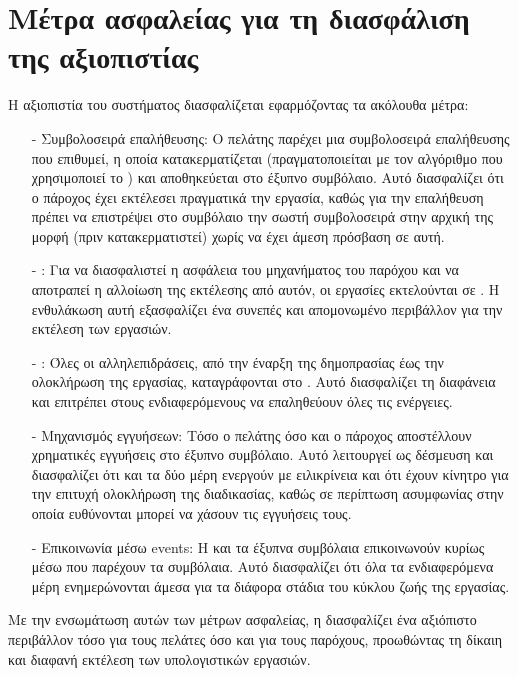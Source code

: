 \section{Μέτρα ασφαλείας για τη διασφάλιση της αξιοπιστίας}
Η αξιοπιστία του συστήματος διασφαλίζεται εφαρμόζοντας τα ακόλουθα μέτρα:
\begin{itemize}
\item[-] Συμβολοσειρά επαλήθευσης: Ο πελάτης παρέχει μια συμβολοσειρά επαλήθευσης που επιθυμεί, η οποία κατακερματίζεται (πραγματοποιείται  με τον αλγόριθμο  που χρησιμοποιεί το ) και αποθηκεύεται στο έξυπνο συμβόλαιο. Αυτό διασφαλίζει ότι ο πάροχος έχει εκτέλεσει πραγματικά την εργασία, καθώς για την επαλήθευση πρέπει να επιστρέψει στο συμβόλαιο την σωστή συμβολοσειρά στην αρχική της μορφή (πριν κατακερματιστεί) χωρίς να έχει άμεση πρόσβαση σε αυτή.
\item[-] : Για να διασφαλιστεί η ασφάλεια του μηχανήματος του παρόχου και να αποτραπεί η αλλοίωση της εκτέλεσης από αυτόν, οι εργασίες εκτελούνται σε . Η ενθυλάκωση αυτή εξασφαλίζει ένα συνεπές και απομονωμένο περιβάλλον για την εκτέλεση των εργασιών.
\item[-] : Όλες οι αλληλεπιδράσεις, από την έναρξη της δημοπρασίας έως την ολοκλήρωση της εργασίας, καταγράφονται στο . Αυτό διασφαλίζει τη διαφάνεια και επιτρέπει στους ενδιαφερόμενους να επαληθεύουν όλες τις ενέργειες. 
\item[-] Μηχανισμός εγγυήσεων:  Τόσο ο πελάτης όσο και ο πάροχος αποστέλλουν χρηματικές εγγυήσεις στο έξυπνο συμβόλαιο. Αυτό λειτουργεί ως δέσμευση και διασφαλίζει ότι και τα δύο μέρη ενεργούν με ειλικρίνεια και ότι έχουν κίνητρο για την επιτυχή ολοκλήρωση της διαδικασίας, καθώς σε περίπτωση ασυμφωνίας στην οποία ευθύνονται μπορεί να χάσουν τις εγγυήσεις τους. 
\item[-] Επικοινωνία μέσω events: Η  και τα έξυπνα συμβόλαια επικοινωνούν κυρίως μέσω  που παρέχουν τα συμβόλαια. Αυτό διασφαλίζει ότι όλα τα ενδιαφερόμενα μέρη ενημερώνονται άμεσα για τα διάφορα στάδια του κύκλου ζωής της εργασίας. 
\end{itemize}

Με την ενσωμάτωση αυτών των μέτρων ασφαλείας, η  διασφαλίζει ένα αξιόπιστο περιβάλλον τόσο για τους πελάτες όσο και για τους παρόχους, προωθώντας τη δίκαιη και διαφανή εκτέλεση των υπολογιστικών εργασιών.